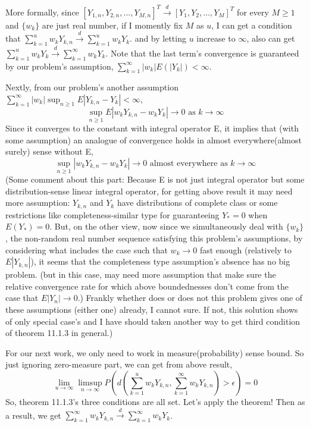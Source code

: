 \documentclass{article}
\begin{document}
More formally, since \([Y_{1,n},Y_{2,n},...,Y_{M,n}]^T\xrightarrow{d} [Y_1,Y_2,...,Y_M]^T\) for every $M\geq1$ and
$\{w_k\}$ are just real number,
if I momently fix $M$ as $u$, I can get a condition that \(\sum_{k=1}^{u}w_kY_{k,n}\xrightarrow{d}\sum_{k=1}^{u}w_kY_{k}\).
and by letting $u$ increase to $\infty$, also can get 
\(\sum_{k=1}^{u}w_kY_{k}\xrightarrow{d}\sum_{k=1}^{\infty}w_kY_{k}\).
Note that the last term's convergence is guaranteed by our problem's assumption, \(\sum_{k=1}^{\infty}|w_k| E(|Y_k|)<\infty\).

Nextly, from our problem's another assumption $\sum_{k=1}^{\infty}|w_k|\sup_{n\geq 1}E|Y_{k,n}-Y_k|<\infty$,
\[\sup_{n\geq 1}E|w_kY_{k,n}-w_kY_k|\rightarrow0 \text{ as } k\rightarrow\infty \]
Since it converges to the constant with integral operator E, 
it implies that (with some assumption) an analogue of convergence holds in almost everywhere(almost surely) sense without E,
\[\sup_{n\geq 1}|w_kY_{k,n}-w_kY_k| \rightarrow 0 \text{ almost everywhere as } k\rightarrow\infty \]
(Some comment about this part: Because E is not just integral operator but some distribution-sense linear integral operator, 
for getting above result it may need more assumption: 
$Y_{k,n}$ and $Y_k$ have distributions of complete class or some restrictions like completeness-similar type for guaranteeing $Y_*=0$ when $E(Y_*)=0$.
But, on the other view, now since we simultaneously deal with $\{w_k\}$, the non-random real number sequence satisfying this problem's assumptions,
by considering what includes the case such that $w_k\rightarrow0$ fast enough (relatively to $E|Y_{k,n}|$), 
it seems that the completeness type assumption's absence has no big problem. (but in this case, may need more assumption that make sure the relative convergence rate
for which above boundednesses don't come from the case that $E|Y_n|\rightarrow0$.)
Frankly whether does or does not this problem gives one of these assumptions (either one) already, I cannot sure.
If not, this solution shows of only special case's and I have should taken another way to get third condition of theorem 11.1.3 in general.)

For our next work, we only need to work in measure(probability) sense bound.
So just ignoring zero-measure part, we can get from above result,
\[\lim_{u\rightarrow\infty}\limsup_{n\rightarrow\infty}P(d(\sum_{k=1}^{u}w_kY_{k,n},\sum_{k=1}^{\infty}w_kY_{k,n})>\epsilon)=0\]
So, theorem 11.1.3's three conditions are all set. Let's apply the theorem! 
Then as a result, we get
\(\sum_{k=1}^{\infty}w_kY_{k,n}\xrightarrow{d}\sum_{k=1}^{\infty}w_kY_k\).
\end{document}

